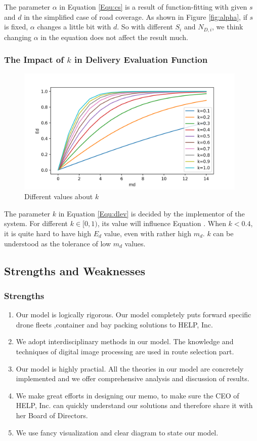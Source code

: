 \documentclass{mcmthesis}
\begin{document}
The parameter $\alpha$ in Equation \eqref{Equ:cs} is a result of function-fitting with given $s$ and $d$ in the simplified case of road coverage. As shown in Figure \ref{fig:alpha}, if $s$ is fixed, $\alpha$ changes a little bit with $d$. So with different $S_i$ and $N_{D,i}$, we think changing $\alpha$ in the equation does not affect the result much.

\subsubsection{The Impact of $k$ in Delivery Evaluation Function}
\begin{figure}[htbp]
    \centering
    \includegraphics[width=11cm]{figures/kvalues.png}
    \caption{Different values about $k$}
    \label{fig:kvalues}
\end{figure}

The parameter $k$ in Equation \eqref{Equ:dlev} is decided by the implementor of the system. For different $k\in [0,1)$, its value will influence Equation . When $k<0.4$, it is quite hard to have high $E_d$ value, even with rather high $m_d$. $k$ can be understood as the tolerance of low $m_d$ values.


\subsection{Strengths and Weaknesses}

\subsubsection{Strengths}

\begin{enumerate}
    \item Our model is logically rigorous. Our model completely puts forward specific drone fleets ,container and bay packing solutions to HELP, Inc.
    \item We adopt interdisciplinary methods in our model. The knowledge and techniques of digital image processing are used in route selection part. 
    \item Our model is highly practial. All the theories in our model are concretely implemented and we offer comprehensive analysis and discussion of results.
    \item We make great efforts in designing our memo, to make sure the CEO of HELP, Inc. can quickly understand our solutions and therefore share it with her Board of Directors.
    \item We use fancy visualization and clear diagram to state our model.
\end{enumerate}
\end{document}
